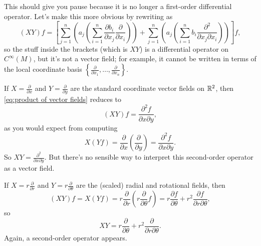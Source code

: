 This should give you pause because it is no longer a first-order differential operator. Let's make this more obvious by rewriting as
\begin{equation}\label{eq:product of vector fields}
	(XY)f = \left[ \sum_{j=1}^n \left(a_j \left( \sum_{i=1}^n \frac{\partial b_i}{\partial x_j} \frac{\partial}{\partial x_i}\right)\right) + \sum_{j=1}^n \left(a_j \left(\sum_{i=1}^n b_i \frac{\partial^2}{\partial x_j \partial x_i}\right)\right)\right]f,
\end{equation}
so the stuff inside the brackets (which is $XY$) is a differential operator on $C^\infty(M)$, but it's not a vector field; for example, it cannot be written in terms of the local coordinate basis $\left\{ \frac{\partial}{\partial x_1}, \dots , \frac{\partial}{\partial x_n}\right\}$.

\begin{example}
	If $X = \frac{\partial}{\partial x}$ and $Y = \frac{\partial}{\partial y}$ are the standard coordinate vector fields on $\mathbb{R}^2$, then \eqref{eq:product of vector fields} reduces to
	\[
		(XY)f = \frac{\partial^2 f}{\partial x \partial y},
	\]
	as you would expect from computing
	\[
		X(Yf) = \frac{\partial}{\partial x} \left( \frac{\partial}{\partial y}\right) = \frac{\partial^2 f}{\partial x \partial y}.
	\]
	So $XY = \frac{\partial^2}{\partial x \partial y}$. But there's no sensible way to interpret this second-order operator as a vector field.
\end{example}

\begin{example}\label{ex:radial and rotational fields}
	If $X = r \frac{\partial}{\partial r}$ and $Y = r \frac{\partial}{\partial \theta}$ are the (scaled) radial and rotational fields, then
	\[
		(XY)f = X(Yf) = r \frac{\partial }{\partial r} \left( r \frac{\partial}{\partial \theta}f \right) = r \frac{\partial f}{\partial \theta} + r^2 \frac{\partial f}{\partial r \partial \theta},
	\]
	so
	\[
		XY = r \frac{\partial}{\partial \theta} + r^2 \frac{\partial}{\partial r \partial \theta}.
	\]
	Again, a second-order operator appears.
\end{example}

